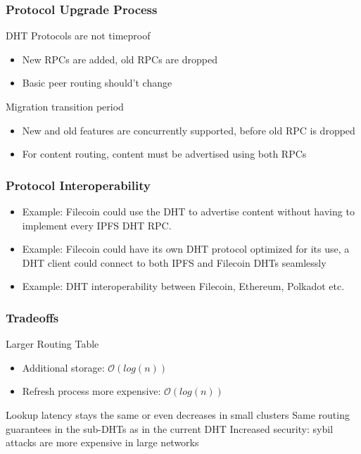 \documentclass{../pl-slide}
\begin{document}
\begin{frame}
\frametitle{Protocol Upgrade Process}

\begin{itemize}
	\itemc DHT Protocols are not timeproof
	\begin{itemize}
		\item[\greencube] New RPCs are added, old RPCs are dropped
		\item[\greencube] Basic peer routing should't change
	\end{itemize}
	\medskip
	\itemc Migration transition period
	\begin{itemize}
		\item[\greencube] New and old features are concurrently supported, before old RPC is dropped
		\item[\greencube] For content routing, content must be advertised using both RPCs
	\end{itemize}
\end{itemize}
\end{frame}

\begin{frame}
\frametitle{Protocol Interoperability}

\begin{itemize}
	\itemc Libp2p global connectivity + global routability
	\itemc Interoperability between multiple libp2p networks using a DHT
	\bigskip
	\item[\greencube] Example: Filecoin could use the DHT to advertise content without having to implement every IPFS DHT RPC.
	\item[\greencube] Example: Filecoin could have its own DHT protocol optimized for its use, a DHT client could connect to both IPFS and Filecoin DHTs seamlessly
	\item[\greencube] Example: DHT interoperability between Filecoin, Ethereum, Polkadot etc.
\end{itemize}
\end{frame}

\begin{frame}
\frametitle{Tradeoffs}

\begin{itemize} 
	\itemc Larger Routing Table
	\begin{itemize}
		\item[\greencube] Additional storage: $\mathcal{O}(log(n))$
		\item[\greencube] Refresh process more expensive: $\mathcal{O}(log(n))$
	\end{itemize}
	\itemc Lookup latency stays the same or even decreases in small clusters
	\itemc Same routing guarantees in the sub-DHTs as in the current DHT
	\itemc Increased security: sybil attacks are more expensive in large networks
\end{itemize}
\end{frame}
\end{document}
